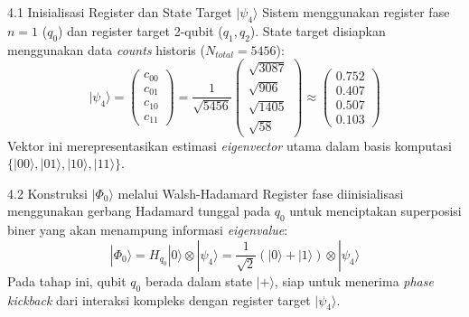 \begin{frame}{4.1 Inisialisasi Register dan State Target $| \psi_4 \rangle$}
    Sistem menggunakan register fase $n=1$ ($q_0$) dan register target 2-qubit ($q_1, q_2$). State target disiapkan menggunakan data \textit{counts} historis ($N_{total} = 5456$):
    \begin{equation}
        | \psi_4 \rangle = \begin{pmatrix} c_{00} \\ c_{01} \\ c_{10} \\ c_{11} \end{pmatrix} = \frac{1}{\sqrt{5456}} \begin{pmatrix} \sqrt{3087} \\ \sqrt{906} \\ \sqrt{1405} \\ \sqrt{58} \end{pmatrix} \approx \begin{pmatrix} 0.752 \\ 0.407 \\ 0.507 \\ 0.103 \end{pmatrix}
    \end{equation}
    Vektor ini merepresentasikan estimasi \textit{eigenvector} utama dalam basis komputasi $\{|00\rangle, |01\rangle, |10\rangle, |11\rangle\}$.
\end{frame}

\begin{frame}{4.2 Konstruksi $|\Phi_0\rangle$ melalui Walsh-Hadamard}
    Register fase diinisialisasi menggunakan gerbang Hadamard tunggal pada $q_0$ untuk menciptakan superposisi biner yang akan menampung informasi \textit{eigenvalue}:
    \begin{equation}
        |\Phi_0\rangle = H_{q_0} |0\rangle \otimes |\psi_4\rangle = \frac{1}{\sqrt{2}}(|0\rangle + |1\rangle) \otimes |\psi_4\rangle
    \end{equation}
    Pada tahap ini, qubit $q_0$ berada dalam state $|+\rangle$, siap untuk menerima \textit{phase kickback} dari interaksi kompleks dengan register target $| \psi_4 \rangle$.
\end{frame}
